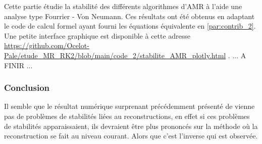 \label{par:stab_amr}
Cette partie étudie la stabilité des différents algorithmes d'AMR à l'aide une analyse type Fourrier - Von Neumann.
Ces résultats ont été obtenus en adaptant le code de calcul formel ayant fourni les équations équivalente en \ref{par:contrib_2}.
Une petite interface graphique est disponible à cette adresse \href{https://github.com/Ocelot-Pale/etude\_MR\_RK2/blob/main/code\_2/stabilite\_AMR\_plotly.html}{https://github.com/Ocelot-Pale/etude\_MR\_RK2/blob/main/code\_2/stabilite\_AMR\_plotly.html}
.
... A FINIR ... 

\subsubsection{Conclusion}
Il semble que le résultat numérique surprenant précédemment présenté de vienne pas de problèmes de stabilités liées au reconstructions, 
en effet si ces problèmes de stabilités apparaissaient, ils devraient être plus prononcés sur la méthode où la reconstruction se fait au niveau courant. 
Alors que c'est l'inverse qui est observée. 
